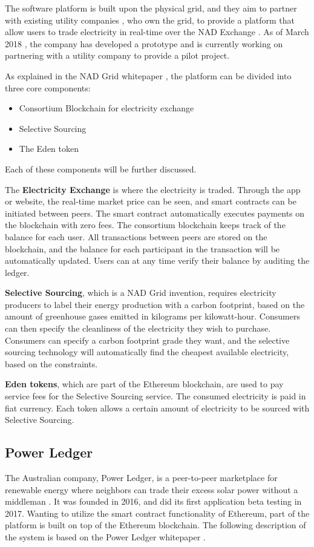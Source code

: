 The software platform is built upon the physical grid, and they aim to partner with existing utility companies \cite{nad_youtube}, who own the grid, to provide a platform that allow users to trade electricity in real-time over the NAD Exchange \cite{nad}. As of March 2018 \cite{nad_youtube}, the company has developed a prototype and is currently working on partnering with a utility company to provide a pilot project.

As explained in the NAD Grid whitepaper \cite{nadgrid}, the platform can be divided into three core components: 
\begin{itemize}
\item Consortium Blockchain for electricity exchange
\item Selective Sourcing
\item The Eden token
\end{itemize}
Each of these components will be further discussed. 

The \textbf{Electricity Exchange} is where the electricity is traded. Through the app or website, the real-time market price can be seen, and smart contracts can be initiated between peers. The smart contract automatically executes payments on the blockchain with zero fees. The consortium blockchain keeps track of the  balance for each user. All transactions between peers are stored on the blockchain, and the balance for each participant in the transaction will be automatically updated. Users can at any time verify their balance by auditing the ledger.

\textbf{Selective Sourcing}, which is a NAD Grid invention, requires electricity producers to label their energy production with a carbon footprint, based on the amount of greenhouse gases emitted in kilograms per kilowatt-hour. Consumers can then specify the cleanliness of the electricity they wish to purchase. Consumers can specify a carbon footprint grade they want, and the selective sourcing technology will automatically find the cheapest available electricity, based on the constraints.

\textbf{Eden tokens}, which are part of the Ethereum blockchain, are used to pay service fees for the Selective Sourcing service. The consumed electricity is paid in fiat currency. Each token allows a certain amount of electricity to be sourced with Selective Sourcing.

\subsection{Power Ledger}
The Australian company, Power Ledger, is a peer-to-peer marketplace for renewable energy where neighbors can trade their excess solar power without a middleman  \cite{pl_home}. It was founded in 2016, and did its first application beta testing in 2017. Wanting to utilize the smart contract functionality of Ethereum, part of the platform is built on top of the Ethereum blockchain. The following description of the system is based on the Power Ledger whitepaper \cite{powerledger}.


